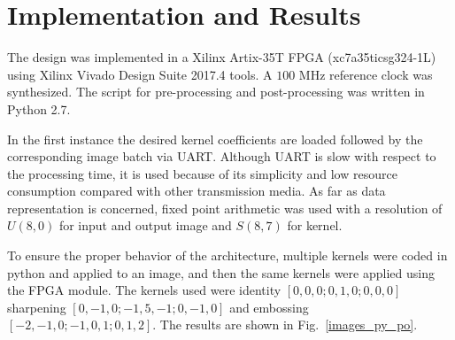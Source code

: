 \documentclass[conference,compsoc]{IEEEtran}
\begin{document}

\section{Implementation and Results}\label{sec:implementation}
The design was implemented in a Xilinx Artix-35T FPGA (xc7a35ticsg324-1L) using
Xilinx Vivado Design Suite 2017.4 tools. A $100$ MHz reference clock
was synthesized. The script for pre-processing and post-processing was written in Python
2.7.

In the first instance the desired kernel coefficients are loaded followed by
the corresponding image batch via UART\@. Although UART is slow with respect to
the processing time, it is used because of its simplicity and low resource
consumption compared with other transmission media.
As far as data representation is concerned, fixed point arithmetic was used with
a resolution of $U(8,0)$ for input and output image and $S(8,7)$ for kernel.

To ensure the proper behavior of the architecture, multiple kernels were
coded in python and applied to an image, and then the same kernels were applied
using the FPGA module. The kernels used were identity $[0, 0, 0; 0, 1, 0; 0, 0,
0]$ sharpening $[0, -1, 0; -1, 5, -1; 0, -1, 0]$ and embossing $[-2, -1, 0; -1,
0, 1; 0, 1, 2]$. The results are shown in Fig.~\ref{images_py_po}. 
\end{document}
